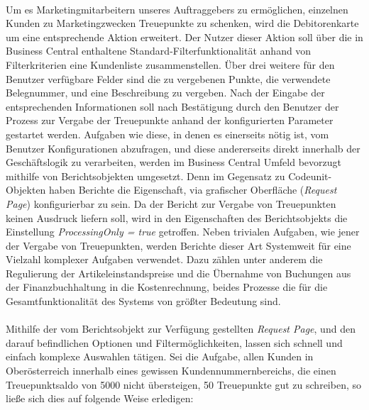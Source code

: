 \paragraph{}
Um es Marketingmitarbeitern unseres Auftraggebers zu ermöglichen, einzelnen Kunden zu Marketingzwecken Treuepunkte zu schenken, wird die Debitorenkarte um eine entsprechende Aktion erweitert. Der Nutzer dieser Aktion soll über die in Business Central enthaltene Standard-Filterfunktionalität anhand von Filterkriterien eine Kundenliste zusammenstellen. Über drei weitere für den Benutzer verfügbare Felder sind die zu vergebenen Punkte, die verwendete Belegnummer, und eine Beschreibung zu vergeben. Nach der Eingabe der entsprechenden Informationen soll nach Bestätigung durch den Benutzer der Prozess zur Vergabe der Treuepunkte anhand der konfigurierten Parameter gestartet werden. Aufgaben wie diese, in denen es einerseits nötig ist, vom Benutzer Konfigurationen abzufragen, und diese andererseits direkt innerhalb der Geschäftslogik zu verarbeiten, werden im Business Central Umfeld bevorzugt mithilfe von Berichtsobjekten umgesetzt. Denn im Gegensatz zu Codeunit-Objekten haben Berichte die Eigenschaft, via grafischer Oberfläche (\textit{Request Page}) konfigurierbar zu sein. Da der Bericht zur Vergabe von Treuepunkten keinen Ausdruck liefern soll, wird in den Eigenschaften des Berichtsobjekts die Einstellung \textit{ProcessingOnly = true} getroffen. Neben trivialen Aufgaben, wie jener der Vergabe von Treuepunkten, werden Berichte dieser Art Systemweit für eine Vielzahl komplexer Aufgaben verwendet. Dazu zählen unter anderem die Regulierung der Artikeleinstandspreise und die Übernahme von Buchungen aus der Finanzbuchhaltung in die Kostenrechnung, beides Prozesse die für die Gesamtfunktionalität des Systems von größter Bedeutung sind.

\paragraph{}
Mithilfe der vom Berichtsobjekt zur Verfügung gestellten \textit{Request Page}, und den darauf befindlichen Optionen und Filtermöglichkeiten, lassen sich schnell und einfach komplexe Auswahlen tätigen. Sei die Aufgabe, allen Kunden in Oberösterreich innerhalb eines gewissen Kundennummernbereichs, die einen Treuepunktsaldo von 5000 nicht übersteigen, 50 Treuepunkte gut zu schreiben, so ließe sich dies auf folgende Weise erledigen:

